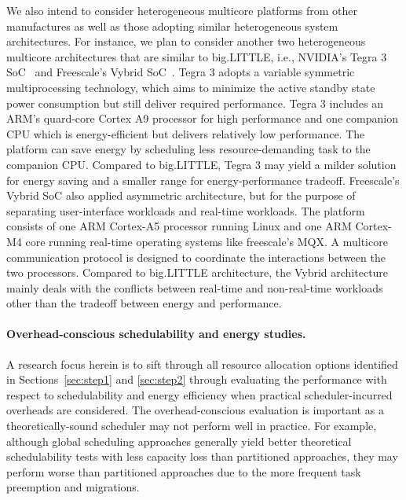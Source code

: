We also intend to consider heterogeneous multicore platforms from other manufactures as well as those adopting similar heterogeneous system architectures. For instance, we plan to consider another  two heterogeneous multicore architectures that are similar to big.LITTLE, i.e., NVIDIA's Tegra 3 SoC~\cite{KalEI} and Freescale's Vybrid SoC~\cite{VybridController}. Tegra 3 adopts a variable symmetric multiprocessing technology, which aims to minimize the active standby state power consumption but still deliver required performance. Tegra 3 includes an ARM's quard-core Cortex A9 processor for high performance and one companion CPU which is energy-efficient but delivers relatively low performance. The platform can save energy by scheduling less resource-demanding task to the companion CPU. Compared to big.LITTLE, Tegra 3 may yield a milder solution for energy saving and a smaller range for energy-performance tradeoff. Freescale's Vybrid SoC also applied asymmetric architecture, but for the purpose of separating user-interface workloads and real-time workloads. The platform consists of one ARM Cortex-A5 processor running Linux and one ARM Cortex-M4 core running real-time operating systems like freescale's MQX. A multicore communication protocol is designed to coordinate the interactions between the two processors. Compared to big.LITTLE architecture, the Vybrid architecture mainly deals with the conflicts between real-time and non-real-time workloads other than the tradeoff between energy and performance.

\vspace{-2mm} \paragraph{Overhead-conscious schedulability and energy studies.} A research focus herein is to sift through all resource allocation options identified in Sections~\ref{sec:step1} and \ref{sec:step2} through evaluating the performance with respect to schedulability and energy efficiency when practical scheduler-incurred overheads are considered. The overhead-conscious evaluation is important as a theoretically-sound scheduler may not perform well in practice. For example, although global scheduling approaches generally yield better theoretical schedulability tests with less capacity loss than partitioned approaches, they may perform worse than partitioned approaches due to the more frequent task preemption and migrations.

